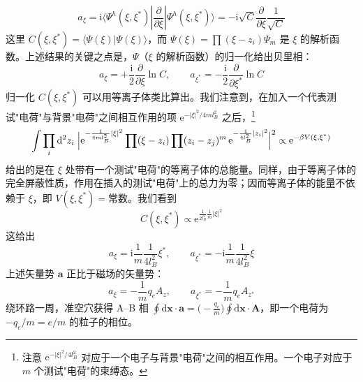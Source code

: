 \begin{equation*}
a_\xi=\mathrm{i}\langle\Psi^h(\xi,\xi^*)|\frac{\partial}{\partial\xi}|\Psi^h(\xi,\xi^*)\rangle=-\mathrm{i}\sqrt{C}\frac{\partial}{\partial\xi}\frac{1}{\sqrt{C}}
\end{equation*}
这里 $C(\xi,\xi^*)=\langle\Psi(\xi)|\Psi(\xi)\rangle$，而 $\Psi(\xi)=\prod(\xi-z_i)\Psi_m$ 是 $\xi$ 的解析函数。上述结果的关键之点是，$\Psi$（$\xi$ 的解析函数）的归一化给出贝里相：
\begin{equation*}
a_\xi=+\frac{\mathrm{i}}{2}\frac{\partial}{\partial\xi}\ln C,\qquad a_{\xi^*}=-\frac{\mathrm{i}}{2}\frac{\partial}{\partial\xi^*}\ln C
\end{equation*}
归一化 $C(\xi,\xi^*)$ 可以用等离子体类比算出。我们注意到，在加入一个代表测试"电荷"与背景"电荷"之间相互作用的项 $\mathrm{e}^{-|\xi|^2/4ml_B^2}$ 之后，\footnote{注意 $\mathrm{e}^{-|\xi|^2/4l_B^2}$ 对应于一个电子与背景"电荷"之间的相互作用。一个电子对应于 $m$ 个测试"电荷"的束缚态。}
\begin{equation*}
\int\prod_i\mathrm{d}^2z_i\;\Bigl|\mathrm{e}^{-\frac{1}{4ml_B^2}|\xi|^2}\prod(\xi-z_i)\prod(z_i-z_j)^m\,\mathrm{e}^{-\frac{1}{4l_B^2}|z_i|^2}\Bigr|^2\propto\mathrm{e}^{-\beta V(\xi,\xi^*)}
\end{equation*}
给出的是在 $\xi$ 处带有一个测试"电荷"的等离子体的总能量。同样，由于等离子体的完全屏蔽性质，作用在插入的测试"电荷"上的总力为零；因而等离子体的能量不依赖于 $\xi$，即 $V(\xi,\xi^*)=\text{常数}$。我们看到
\begin{equation*}
C(\xi,\xi^*)\propto\mathrm{e}^{\frac{1}{2l_B^2}\frac{1}{m}|\xi|^2}
\end{equation*}
这给出
\begin{equation*}
a_\xi=\mathrm{i}\frac{1}{m}\frac{1}{4l_B^2}\xi^*,\qquad a_{\xi^*}=-\mathrm{i}\frac{1}{m}\frac{1}{4l_B^2}\xi
\end{equation*}
上述矢量势 $\pmb{a}$ 正比于磁场的矢量势：
\begin{equation*}
a_\xi=-\frac{1}{m}q_eA_z,\qquad a_{\xi^*}=-\frac{1}{m}q_eA_{z^*}
\end{equation*}
绕环路一周，准空穴获得 A--B 相 $\oint\mathrm{d}\pmb{x}\cdot\pmb{a}=\bigl(-\frac{q_e}{m}\bigr)\oint\mathrm{d}\pmb{x}\cdot\pmb{A}$，即一个电荷为 $-q_e/m=e/m$ 的粒子的相位。

